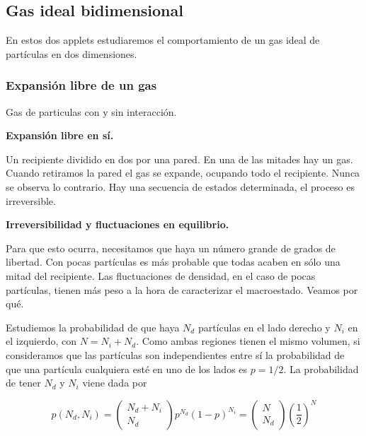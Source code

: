 \documentclass[11pt, a4paper]{article} %
\theoremstyle{named}
\begin{document}

    \newpage
    \subsection{Gas ideal bidimensional}\label{sec:gases}

        En estos dos applets estudiaremos el comportamiento de un gas ideal de partículas en dos dimensiones.

        \subsubsection{Expansión libre de un gas}\label{sec:equilibrio}

            Gas de particulas con y sin interacción.

            \textbf{Expansión libre en sí.}

            Un recipiente dividido en dos por una pared. En una de las mitades hay un gas. Cuando retiramos la pared el gas se expande, ocupando todo el recipiente. Nunca se observa lo contrario. Hay una secuencia de estados determinada, el proceso es irreversible.

            \textbf{Irreversibilidad y fluctuaciones en equilibrio.}

            Para que esto ocurra, necesitamos que haya un número grande de grados de libertad. Con pocas partículas es más probable que todas acaben en sólo una mitad del recipiente. Las fluctuaciones de densidad, en el caso de pocas partículas, tienen más peso a la hora de caracterizar el macroestado. Veamos por qué.

            Estudiemos la probabilidad de que haya $N_d$ partículas en el lado derecho y $N_i$ en el izquierdo, con $N = N_i + N_d$. Como ambas regiones tienen el mismo volumen, si consideramos que las partículas son independientes entre sí la probabilidad de que una partícula cualquiera esté en uno de los lados es $p={1/2}$. La probabilidad de tener $N_d$ y $N_i$ viene dada por

            $$
            p\left(N_{d}, N_{i}\right)=\left(\begin{array}{c}
            {N_{d}+N_{i}} \\
            {N_{d}}
            \end{array}\right) p^{N_{d}}(1-p)^{N_{i}}=\left(\begin{array}{c}
            {N} \\
            {N_{d}}
            \end{array}\right)\left(\frac{1}{2}\right)^{N}
            $$
\end{document}
